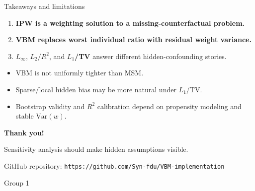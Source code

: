 \documentclass[aspectratio=169,10pt]{ctexbeamer}
\newcommand{\keyword}[1]{\textcolor{DeepBlue}{\textbf{#1}}}
\newcommand{\vbm}[1]{\textcolor{VBMBlue}{\textbf{#1}}}
\newcommand{\msm}[1]{\textcolor{MSMOrange}{\textbf{#1}}}
\begin{document}
\begin{frame}{Takeaways and limitations}
  \vspace{0.2cm}
  \begin{enumerate}
    \item \keyword{IPW is a weighting solution to a missing-counterfactual problem.}
    \vspace{0.35em}
    \item \vbm{VBM replaces worst individual ratio with residual weight variance.}
    \vspace{0.35em}
    \item \msm{$L_\infty$}, \vbm{$L_2/R^2$}, and \keyword{$L_1$/TV} answer different hidden-confounding stories.
  \end{enumerate}

  \vspace{0.5cm}
  \begin{redbox}[title=Limitations worth saying out loud]
    \small
    \begin{itemize}
      \item VBM is not uniformly tighter than MSM.
      \item Sparse/local hidden bias may be more natural under $L_1$/TV.
      \item Bootstrap validity and $R^2$ calibration depend on propensity modeling and stable $\mathrm{Var}(w)$.
    \end{itemize}
  \end{redbox}
\end{frame}

\begin{frame}[plain]
  \vspace{1.2cm}
  \begin{center}
    {\Huge\bfseries\color{DeepBlue} Thank you!}\\[0.55cm]

    \vspace{0.8cm}
    \begin{bluebox}[width=0.8\textwidth]
      \centering
      \large Sensitivity analysis should make hidden assumptions visible.
    \end{bluebox}

    \vspace{0.45cm}
    {\small\color{MidGray}
    GitHub repository: \texttt{https://github.com/Syn-fdu/VBM-implementation}}

    \vspace{0.55cm}
    {\small\color{MidGray}
    Group 1}
  \end{center}
\end{frame}
\end{document}
